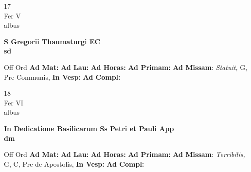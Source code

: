 \documentclass[10pt, openany]{book}
\begin{document}
    \begin{center}
        \begin{minipage}{3.5in}
            \vspace{2em}
            \begin{minipage}{0.5in}
                {\Huge 17} \\
                {\normalsize Fer V} \\
                {\normalsize albus}
            \end{minipage}
            \begin{minipage}{3.0in}
                \textbf{ \large S Gregorii Thaumaturgi EC \\
                \textnormal{\normalsize sd}} \\ 
            \end{minipage}
            \begin{justify}Off Ord
                \textbf{Ad Mat: }
                \textbf{Ad Lau: }
                \textbf{Ad Horas: }
                \textbf{Ad Primam: }\textbf{Ad Missam}: \textit{Statuit,} G, Pre Communis,  
                \textbf{In Vesp: }
                \textbf{Ad Compl: }
            \end{justify}
        \end{minipage}
    \end{center}

    \begin{center}
        \begin{minipage}{3.5in}
            \vspace{2em}
            \begin{minipage}{0.5in}
                {\Huge 18} \\
                {\normalsize Fer VI} \\
                {\normalsize albus}
            \end{minipage}
            \begin{minipage}{3.0in}
                \textbf{ \large In Dedicatione Basilicarum Ss Petri et Pauli App \\
                \textnormal{\normalsize dm}} \\ 
            \end{minipage}
            \begin{justify}Off Ord
                \textbf{Ad Mat: }
                \textbf{Ad Lau: }
                \textbf{Ad Horas: }
                \textbf{Ad Primam: }\textbf{Ad Missam}: \textit{Terribilis,} G, C, Pre de Apostolis,  
                \textbf{In Vesp: }
                \textbf{Ad Compl: }
            \end{justify}
        \end{minipage}
    \end{center}
\end{document}
